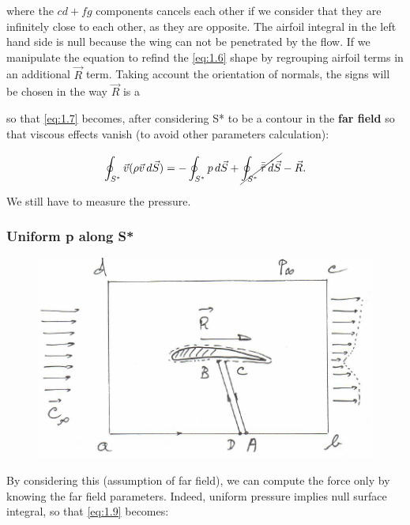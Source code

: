 		where the $cd + fg$ components cancels each other if we consider that they are infinitely close to each other, as they are opposite. The airfoil integral in the left hand side is null because the wing can not be penetrated by the flow. If we manipulate the equation to refind the \eqref{eq:1.6} shape by regrouping airfoil terms in an additional $\vec{R}$ term. Taking account the orientation of normals, the signs will be chosen in the way $\vec{R}$ is a
		
		\begin{center}
		\end{center}
		
		so that \eqref{eq:1.7} becomes, after considering S* to be a contour in the \textbf{far field} so that viscous effects vanish (to avoid other parameters calculation):
		
		\begin{equation}
		\oint _{S^*} \vec{v} (\rho \vec{v} \, d\vec{S}) = -\oint _{S^*} p \, d\vec{S} + \cancel{\oint _{S^*} \bar{\bar{\tau}} \, d\vec{S}} - \vec{R}.
		\label{eq:1.9}
		\end{equation}
		
		We still have to measure the pressure.
		
		\subsubsection{Uniform p along S*}
				\begin{figure}
				\vspace{-5mm}
				\includegraphics[scale=0.52]{ch1/2}
				\end{figure}
				By considering this (assumption of far field), we can compute the force only by knowing the far field parameters. Indeed, uniform pressure implies null surface integral, so that \eqref{eq:1.9} becomes:
				
